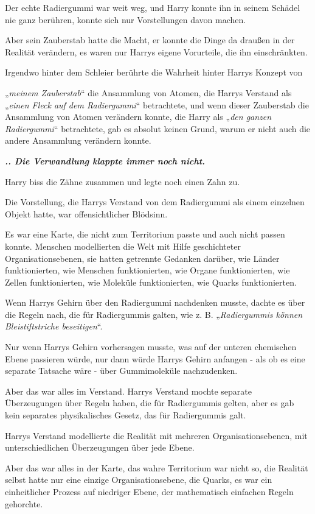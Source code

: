{Der echte Radiergummi war weit weg, und Harry konnte ihn in seinem Schädel nie ganz berühren, konnte sich nur Vorstellungen davon machen.

Aber sein Zauberstab hatte die Macht, er konnte die Dinge da draußen in der Realität verändern, es waren nur Harrys eigene Vorurteile, die ihn einschränkten.

Irgendwo hinter dem Schleier berührte die Wahrheit hinter Harrys Konzept von

„\emph{meinem Zauberstab}“ die Ansammlung von Atomen, die Harrys Verstand als „\emph{einen Fleck auf dem Radiergummi}“ betrachtete, und wenn dieser Zauberstab die Ansammlung von Atomen verändern konnte, die Harry als „\emph{den ganzen Radiergummi}“ betrachtete, gab es absolut keinen Grund, warum er nicht auch die andere Ansammlung verändern konnte.

\textbf{\emph{.. Die Verwandlung klappte immer noch nicht.}}

Harry biss die Zähne zusammen und legte noch einen Zahn zu.

Die Vorstellung, die Harrys Verstand von dem Radiergummi als einem einzelnen Objekt hatte, war offensichtlicher Blödsinn.

Es war eine Karte, die nicht zum Territorium passte und auch nicht passen konnte. Menschen modellierten die Welt mit Hilfe geschichteter Organisationsebenen, sie hatten getrennte Gedanken darüber, wie Länder funktionierten, wie Menschen funktionierten, wie Organe funktionierten, wie Zellen funktionierten, wie Moleküle funktionierten, wie Quarks funktionierten.

Wenn Harrys Gehirn über den Radiergummi nachdenken musste, dachte es über die Regeln nach, die für Radiergummis galten, wie z. B. „\emph{Radiergummis können Bleistiftstriche beseitigen}“.

Nur wenn Harrys Gehirn vorhersagen musste, was auf der unteren chemischen Ebene passieren würde, nur dann würde Harrys Gehirn anfangen - als ob es eine separate Tatsache wäre - über Gummimoleküle nachzudenken.

Aber das war alles im Verstand. Harrys Verstand mochte separate Überzeugungen über Regeln haben, die für Radiergummis gelten, aber es gab kein separates physikalisches Gesetz, das für Radiergummis galt.

Harrys Verstand modellierte die Realität mit mehreren Organisationsebenen, mit unterschiedlichen Überzeugungen über jede Ebene.

Aber das war alles in der Karte, das wahre Territorium war nicht so, die Realität selbst hatte nur eine einzige Organisationsebene, die Quarks, es war ein einheitlicher Prozess auf niedriger Ebene, der mathematisch einfachen Regeln gehorchte.

}
